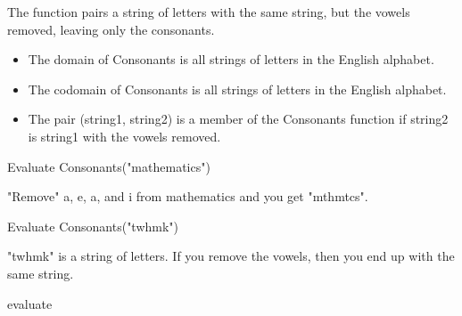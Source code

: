 \documentclass{ximera}
\begin{document}
\begin{definition}
  The function  pairs a string of letters with the same string, but the vowels removed, leaving only the consonants.
 
    \begin{itemize}
    \item The domain of Consonants is all strings of letters in the English alphabet.
    \item The codomain of Consonants is all strings of letters in the English alphabet.
    \item The pair (string1, string2) is a member of the Consonants function if string2 is string1 with the vowels removed.
    \end{itemize}

  
\end{definition}



\begin{exercise}

 Evaluate Consonants("mathematics")

  \begin{multipleChoice}
  \end{multipleChoice}
  \begin{feedback}
"Remove" a, e, a, and i from mathematics and you get "mthmtcs".
  \end{feedback}
\end{exercise}



\begin{exercise}

 Evaluate Consonants("twhmk")

  \begin{multipleChoice}
  \end{multipleChoice}
  \begin{feedback}
"twhmk" is a string of letters. If you remove the vowels, then you end up with the same string.
  \end{feedback}
\end{exercise}

evaluate 
\end{document}
